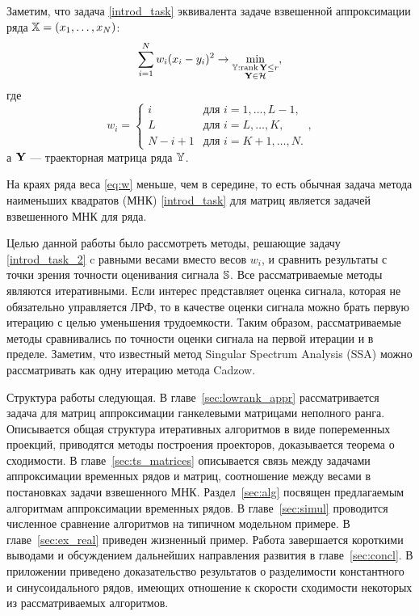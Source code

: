 \documentclass[12pt, specialist, subf,href,colorlinks=true,substylefile = spbu.rtx]{disser}
\def\rank{\mathop{\mathrm{rank}}}
\theoremstyle{remark}
\theoremstyle{definition}
\begin{document}
Заметим, что задача \eqref{introd_task} эквивалента задаче взвешенной аппроксимации ряда $\mathbb{X} = (x_1, \ldots, x_N)$:
\begin{equation}\label{introd_task_2}
\sum_{i = 1}^N w_i(x_i - y_i)^2 \to \min_{\substack{\tsY: \rank \bfY \le r \\ \bfY \in \calH}},
\end{equation}
где
\begin{equation}
\label{eq:w}
w_i = \begin{cases}
i & \text{для $i = 1, \ldots, L-1,$}\\
L & \text{для $i = L, \ldots, K,$}\\
N - i + 1 & \text{для $i = K + 1, \ldots, N.$}
\end{cases},
\end{equation}
а $\mathbf{Y}$ --- траекторная матрица ряда $\mathbb{Y}$.

На краях ряда веса \eqref{eq:w} меньше, чем в середине, то есть обычная задача метода наименьших квадратов (МНК) \eqref{introd_task} для матриц является задачей взвешенного МНК для ряда.

Целью данной работы было рассмотреть методы, решающие задачу \eqref{introd_task_2} c равными весами вместо весов $w_i$, и сравнить результаты с точки зрения точности оценивания сигнала $\mathbb{S}$. Все рассматриваемые методы являются итеративными. Если интерес представляет оценка сигнала, которая не обязательно управляется ЛРФ, то в качестве оценки сигнала можно брать первую итерацию с целью уменьшения трудоемкости. Таким образом, рассматриваемые методы сравнивались по точности оценки сигнала на первой итерации и в пределе. Заметим, что известный метод Singular Spectrum Analysis (SSA) \cite{Broomhead.King1986, Vautard.etal1992, Elsner.Tsonis1996, Golyandina.etal2001, Ghil.etal2002, Golyandina.Zhigljavsky2012} можно
рассматривать как одну итерацию метода Cadzow.

Структура работы следующая.  В главе~\ref{sec:lowrank_appr} рассматривается задача для матриц аппроксимации ганкелевыми матрицами неполного ранга.
Описывается общая структура итеративных алгоритмов в виде попеременных проекций, приводятся методы построения проекторов, доказывается теорема о сходимости.
В главе~\ref{sec:ts_matrices} описывается связь между задачами аппроксимации временных рядов и матриц, соотношение между весами в постановках задачи
взвешенного МНК. Раздел~\ref{sec:alg} посвящен предлагаемым алгоритмам аппроксимации временных рядов. В главе~\ref{sec:simul} проводится численное сравнение алгоритмов на типичном модельном примере. В главе~\ref{sec:ex_real} приведен жизненный пример.
Работа завершается короткими выводами и обсуждением дальнейших направления развития в главе~\ref{sec:concl}. В приложении приведено доказательство результатов
о разделимости константного и синусоидального рядов, имеющих отношение к скорости сходимости некоторых из рассматриваемых алгоритмов.
\end{document}

